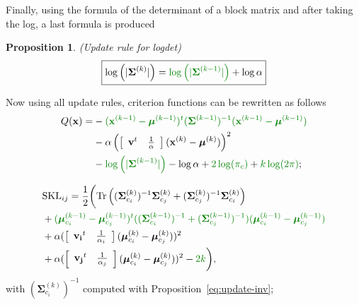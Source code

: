 \documentclass[journal,peerreview,onecolumn]{IEEEtran}
\newtheorem{prop}{Proposition}
\begin{document}
        Finally, using the formula of the determinant of a block matrix and after taking the log, a last formula is produced
        \begin{prop}
        \label{eq:update-log}
            (Update rule for logdet)
            \begin{equation*}
                \fbox{$\log \left(|\boldsymbol{\Sigma}^{(k)}|\right) = \textcolor[rgb]{0,0.5,0}{\log \left(|\boldsymbol{\Sigma}^{(k-1)}|\right)} + \log \alpha$}
            \end{equation*}
        \end{prop}

        Now using all update rules, criterion functions can be rewritten as follows
        \begin{align}
        \label{eq:q-update}
            Q(\mathbf{x}) = &- \textcolor[rgb]{0,0.5,0}{(\mathbf{x}^{(k-1)} - \boldsymbol{\mu}^{(k-1)})^t (\boldsymbol{\Sigma}^{(k-1)})^{-1} (\mathbf{x}^{(k-1)} - \boldsymbol{\mu}^{(k-1)})} \nonumber \\
            &- \alpha \left( \left[\begin{array}{cc} \mathbf{v}^t & \frac{1}{\alpha} \end{array}\right] (\mathbf{x}^{(k)} - \boldsymbol{\mu}^{(k)}) \right)^2 \nonumber \\
            &- \textcolor[rgb]{0,0.5,0}{\log \left(|\boldsymbol{\Sigma}^{(k-1)}|\right)} - \log \alpha  + \textcolor[rgb]{0,0.5,0}{2 \log (\pi_c)} + \textcolor[rgb]{0,0.5,0}{k \log(2 \pi)};
        \end{align}

        {\footnotesize
        \begin{align}
        \label{eq:skl-update}
            &\text{SKL}_{ij} = \frac{1}{2} \biggl( \text{Tr} \left((\boldsymbol{\Sigma}_{c_i}^{(k)})^{-1} \boldsymbol{\Sigma}_{c_j}^{(k)} + (\boldsymbol{\Sigma}_{c_j}^{(k)})^{-1} \boldsymbol{\Sigma}_{c_i}^{(k)}\right) \nonumber \\
            &+ \textcolor[rgb]{0,0.5,0}{(\boldsymbol{\mu}_{c_i}^{(k-1)} - \boldsymbol{\mu}_{c_j}^{(k-1)})^t ((\boldsymbol{\Sigma}_{c_i}^{(k-1)})^{-1} + (\boldsymbol{\Sigma}_{c_j}^{(k-1)})^{-1}) (\boldsymbol{\mu}_{c_i}^{(k-1)} - \boldsymbol{\mu}_{c_j}^{(k-1)})} \nonumber \\
            &+ \alpha ( \left[\begin{array}{cc} \mathbf{v_i}^t & \frac{1}{\alpha_i} \end{array}\right] (\boldsymbol{\mu}_{c_i}^{(k)} - \boldsymbol{\mu}_{c_j}^{(k)}) )^2 \nonumber \\
            &+ \alpha ( \left[\begin{array}{cc} \mathbf{v_j}^t & \frac{1}{\alpha_j} \end{array}\right] (\boldsymbol{\mu}_{c_i}^{(k)} - \boldsymbol{\mu}_{c_j}^{(k)}) )^2
            - \textcolor[rgb]{0,0.5,0}{2k} \biggr),
        \end{align}
        }
        with $(\boldsymbol{\Sigma}_{c_i}^{(k)})^{-1}$ computed with Proposition~\ref{eq:update-inv};
\end{document}
